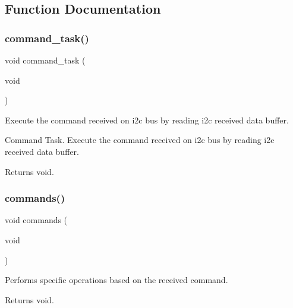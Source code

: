 \subsection{Function Documentation}
\mbox{\label{i2c-rain_8ino_a42389aceb96a84573eb67e6d141cb594}} 
\subsubsection{\texorpdfstring{command\+\_\+task()}{command\_task()}}
{\footnotesize\ttfamily void command\+\_\+task (\begin{DoxyParamCaption}\item[{void}]{ }\end{DoxyParamCaption})}



Execute the command received on i2c bus by reading i2c received data buffer. 

Command Task. Execute the command received on i2c bus by reading i2c received data buffer.

\begin{DoxyReturn}{Returns}
void. 
\end{DoxyReturn}
\mbox{\label{i2c-rain_8ino_a4981066e183f1432ffd6eddf55826585}} 
\subsubsection{\texorpdfstring{commands()}{commands()}}
{\footnotesize\ttfamily void commands (\begin{DoxyParamCaption}\item[{void}]{ }\end{DoxyParamCaption})}



Performs specific operations based on the received command. 

\begin{DoxyReturn}{Returns}
void. 
\end{DoxyReturn}
\mbox{\label{i2c-rain_8ino_a46696a96b3118b5d8900703c054166c8}} 
